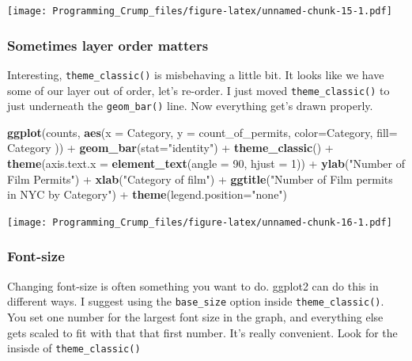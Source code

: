 \documentclass[]{book}
\newenvironment{Shaded}{\begin{snugshade}}{\end{snugshade}}
\newcommand{\KeywordTok}[1]{\textcolor[rgb]{0.13,0.29,0.53}{\textbf{{#1}}}}
\newcommand{\DataTypeTok}[1]{\textcolor[rgb]{0.13,0.29,0.53}{{#1}}}
\newcommand{\DecValTok}[1]{\textcolor[rgb]{0.00,0.00,0.81}{{#1}}}
\newcommand{\StringTok}[1]{\textcolor[rgb]{0.31,0.60,0.02}{{#1}}}
\newcommand{\NormalTok}[1]{{#1}}
\theoremstyle{definition}
\theoremstyle{definition}
\theoremstyle{definition}
\theoremstyle{remark}
\begin{document}
\texttt{[image: Programming\_Crump\_files/figure-latex/unnamed-chunk-15-1.pdf]}

\subsubsection{Sometimes layer order
matters}\label{sometimes-layer-order-matters}

Interesting, \texttt{theme\_classic()} is misbehaving a little bit. It
looks like we have some of our layer out of order, let's re-order. I
just moved \texttt{theme\_classic()} to just underneath the
\texttt{geom\_bar()} line. Now everything get's drawn properly.

\begin{Shaded}
\begin{Highlighting}[]
\KeywordTok{ggplot}\NormalTok{(counts, }\KeywordTok{aes}\NormalTok{(}\DataTypeTok{x =} \NormalTok{Category, }\DataTypeTok{y =} \NormalTok{count_of_permits, }
                   \DataTypeTok{color=}\NormalTok{Category, }
                   \DataTypeTok{fill=} \NormalTok{Category )) +}
\StringTok{  }\KeywordTok{geom_bar}\NormalTok{(}\DataTypeTok{stat=}\StringTok{"identity"}\NormalTok{) +}\StringTok{ }
\StringTok{  }\KeywordTok{theme_classic}\NormalTok{() +}
\StringTok{  }\KeywordTok{theme}\NormalTok{(}\DataTypeTok{axis.text.x =} \KeywordTok{element_text}\NormalTok{(}\DataTypeTok{angle =} \DecValTok{90}\NormalTok{, }\DataTypeTok{hjust =} \DecValTok{1}\NormalTok{)) +}
\StringTok{  }\KeywordTok{ylab}\NormalTok{(}\StringTok{"Number of Film Permits"}\NormalTok{) +}\StringTok{ }
\StringTok{  }\KeywordTok{xlab}\NormalTok{(}\StringTok{"Category of film"}\NormalTok{) +}
\StringTok{  }\KeywordTok{ggtitle}\NormalTok{(}\StringTok{"Number of Film permits in NYC by Category"}\NormalTok{) +}
\StringTok{  }\KeywordTok{theme}\NormalTok{(}\DataTypeTok{legend.position=}\StringTok{"none"}\NormalTok{) }
\end{Highlighting}
\end{Shaded}

\texttt{[image: Programming\_Crump\_files/figure-latex/unnamed-chunk-16-1.pdf]}

\subsubsection{Font-size}\label{font-size}

Changing font-size is often something you want to do. ggplot2 can do
this in different ways. I suggest using the \texttt{base\_size} option
inside \texttt{theme\_classic()}. You set one number for the largest
font size in the graph, and everything else gets scaled to fit with that
that first number. It's really convenient. Look for the insisde of
\texttt{theme\_classic()}
\end{document}
